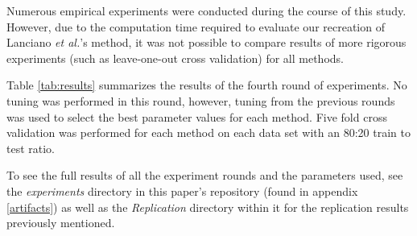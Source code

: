 \documentclass[sigconf]{acmart}
\begin{document}
Numerous empirical experiments were conducted during the course of this study.
However, due to the computation time required to evaluate our recreation of Lanciano \emph{et al.}'s method, it was not possible to compare results of more rigorous experiments (such as leave-one-out cross validation) for all methods.

Table \ref{tab:results} summarizes the results of the fourth round of experiments.
No tuning was performed in this round, however, tuning from the previous rounds was used to select the best parameter values for each method.
Five fold cross validation was performed for each method on each data set with an 80:20 train to test ratio.

To see the full results of all the experiment rounds and the parameters used, see the \emph{experiments} directory in this paper's repository (found in appendix \ref{artifacts}) as well as the \emph{Replication} directory within it for the replication results previously mentioned.
\end{document}
